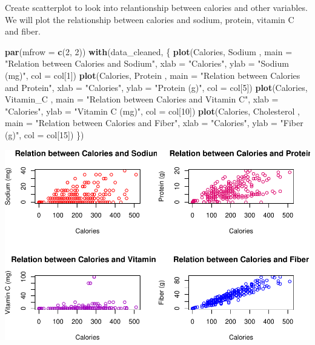 \documentclass[
]{article}
\newenvironment{Shaded}{\begin{snugshade}}{\end{snugshade}}
\newcommand{\AttributeTok}[1]{\textcolor[rgb]{0.13,0.29,0.53}{#1}}
\newcommand{\DecValTok}[1]{\textcolor[rgb]{0.00,0.00,0.81}{#1}}
\newcommand{\FunctionTok}[1]{\textcolor[rgb]{0.13,0.29,0.53}{\textbf{#1}}}
\newcommand{\NormalTok}[1]{#1}
\newcommand{\StringTok}[1]{\textcolor[rgb]{0.31,0.60,0.02}{#1}}
\begin{document}
Create scatterplot to look into relantionship between calories and other
variables. We will plot the relationship between calories and sodium,
protein, vitamin C and fiber.

\begin{Shaded}
\begin{Highlighting}[]
\FunctionTok{par}\NormalTok{(}\AttributeTok{mfrow =} \FunctionTok{c}\NormalTok{(}\DecValTok{2}\NormalTok{, }\DecValTok{2}\NormalTok{))}
\FunctionTok{with}\NormalTok{(data\_cleaned, \{}
  \FunctionTok{plot}\NormalTok{(Calories, Sodium , }\AttributeTok{main =} \StringTok{"Relation between Calories and Sodium"}\NormalTok{,}
       \AttributeTok{xlab =} \StringTok{"Calories"}\NormalTok{, }\AttributeTok{ylab =} \StringTok{"Sodium (mg)"}\NormalTok{, }\AttributeTok{col =}\NormalTok{ col[}\DecValTok{1}\NormalTok{])}
  \FunctionTok{plot}\NormalTok{(Calories, Protein , }\AttributeTok{main =} \StringTok{"Relation between Calories and Protein"}\NormalTok{,}
       \AttributeTok{xlab =} \StringTok{"Calories"}\NormalTok{, }\AttributeTok{ylab =} \StringTok{"Protein (g)"}\NormalTok{, }\AttributeTok{col =}\NormalTok{ col[}\DecValTok{5}\NormalTok{])}
  \FunctionTok{plot}\NormalTok{(Calories, Vitamin\_C , }\AttributeTok{main =} \StringTok{"Relation between Calories and Vitamin C"}\NormalTok{,}
       \AttributeTok{xlab =} \StringTok{"Calories"}\NormalTok{, }\AttributeTok{ylab =} \StringTok{"Vitamin C (mg)"}\NormalTok{, }\AttributeTok{col =}\NormalTok{ col[}\DecValTok{10}\NormalTok{])}
  \FunctionTok{plot}\NormalTok{(Calories, Cholesterol , }\AttributeTok{main =} \StringTok{"Relation between Calories and Fiber"}\NormalTok{,}
       \AttributeTok{xlab =} \StringTok{"Calories"}\NormalTok{, }\AttributeTok{ylab =} \StringTok{"Fiber (g)"}\NormalTok{, }\AttributeTok{col =}\NormalTok{ col[}\DecValTok{15}\NormalTok{])}
\NormalTok{\})}
\end{Highlighting}
\end{Shaded}

\begin{center}\includegraphics{Statistical_Learning_Final_Report_files/figure-latex/scatterplot-1} \end{center}
\end{document}
